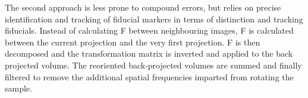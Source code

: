 
The second approach is less prone to compound errors, but relies on precise identification and tracking of fiducial markers in terms of distinction and tracking fiducials.
Instead of calculating \gls{F} between neighbouring images, \gls{F} is calculated between the current projection and the very first projection.
\gls{F} is then decomposed and the transformation matrix is inverted and applied to the back projected volume.
The reoriented back-projected volumes are summed and finally filtered to remove the additional spatial frequencies imparted from rotating the sample.


